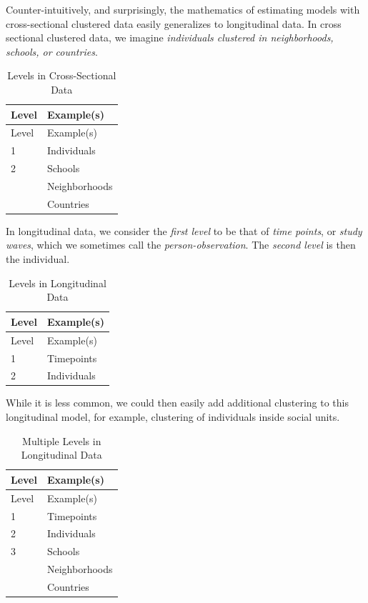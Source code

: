 \documentclass[
  letterpaper,
  DIV=11,
  numbers=noendperiod]{scrreprt}
\begin{document}
Counter-intuitively, and surprisingly, the mathematics of estimating
models with cross-sectional clustered data easily generalizes to
longitudinal data. In cross sectional clustered data, we imagine
\emph{individuals clustered in neighborhoods, schools, or countries}.

\hypertarget{tbl-levelscrosssectional}{}
\begin{longtable}[]{@{}ll@{}}
\caption{\label{tbl-levelscrosssectional}Levels in Cross-Sectional
Data}\tabularnewline
\toprule()
Level & Example(s) \\
\midrule()
\endfirsthead
\toprule()
Level & Example(s) \\
\midrule()
\endhead
1 & Individuals \\
2 & Schools \\
& Neighborhoods \\
& Countries \\
\bottomrule()
\end{longtable}

In longitudinal data, we consider the \emph{first level} to be that of
\emph{time points}, or \emph{study waves}, which we sometimes call the
\emph{person-observation}. The \emph{second level} is then the
individual.

\hypertarget{tbl-levelslongitudinal}{}
\begin{longtable}[]{@{}ll@{}}
\caption{\label{tbl-levelslongitudinal}Levels in Longitudinal
Data}\tabularnewline
\toprule()
Level & Example(s) \\
\midrule()
\endfirsthead
\toprule()
Level & Example(s) \\
\midrule()
\endhead
1 & Timepoints \\
2 & Individuals \\
\bottomrule()
\end{longtable}

While it is less common, we could then easily add additional clustering
to this longitudinal model, for example, clustering of individuals
inside social units.

\hypertarget{tbl-levelslongitudinal2}{}
\begin{longtable}[]{@{}ll@{}}
\caption{\label{tbl-levelslongitudinal2}Multiple Levels in Longitudinal
Data}\tabularnewline
\toprule()
Level & Example(s) \\
\midrule()
\endfirsthead
\toprule()
Level & Example(s) \\
\midrule()
\endhead
1 & Timepoints \\
2 & Individuals \\
3 & Schools \\
& Neighborhoods \\
& Countries \\
\bottomrule()
\end{longtable}
\end{document}
